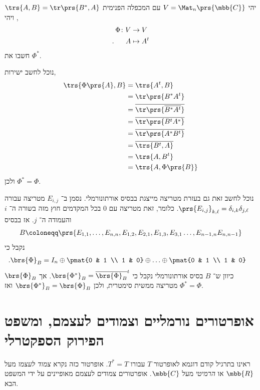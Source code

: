\documentclass[a4paper,10pt,twoside,openany]{book}
\begin{document}
\begin{exercisechap}
יהי
$V = \Mat_n\prs{\mbb{C}}$
עם המכפלה הפנימית
$\trs{A,B} = \tr\prs{B^*, A}$,
ויהי
\begin{align*}
    \Phi \colon V &\to V \\
    \text{.} \hphantom{lala} A &\mapsto A^t
\end{align*}
חשבו את
$\Phi^*$.
\end{exercisechap}

\begin{solution}
נוכל לחשב ישירות,
\begin{align*}
    \trs{\Phi\prs{A},B} &= \trs{A^t, B} \\&= \tr\prs{B^* A^t} \\&= \overline{\tr\prs{\overline{B^* A^t}}} \\&= \overline{\tr\prs{B^t A^*}} \\&= \overline{\tr\prs{A^* B^t}} \\&= \overline{\trs{B^t, A}} \\&= \trs{A, B^t} \\&= \trs{A, \Phi\prs{B}}
\end{align*}
ולכן
$\Phi^* = \Phi$.

נוכל לחשב זאת גם בעזרת מטריצה מייצגת בבסיס אורתונורמלי.
נסמן ב־%
$E_{i,j}$
מטריצה עבורה
$\prs{E_{i,j}}_{k,\ell} = \delta_{i,k} \delta_{j,\ell}$.
כלומר, זאת מטריצה עם
$0$
בכל המקדמים חוץ מזה בשורה ה־%
$i$
והעמודה ה־%
$j$.
אז בבסיס
\[B \coloneqq \prs{E_{1,1}, \ldots, E_{n,n}, E_{1,2}, E_{2,1}, E_{1,3}, E_{3,1} \ldots, E_{n-1, n} E_{n,n-1}}\]
נקבל כי
\begin{align*}
    \text{.} \brs{\Phi}_B &= I_n \oplus \pmat{0 & 1 \\ 1 & 0} \oplus \ldots \oplus \pmat{0 & 1 \\ 1 & 0}
\end{align*}
כיוון ש־%
$B$
בסיס אורתונורמלי
נקבל כי
$\brs{\Phi^*}_B = \overline{\brs{\Phi}_B}^t$.
אך
$\brs{\Phi}_B$
מטריצה ממשית סימטרית, ולכן
$\brs{\Phi^*}_B = \brs{\Phi}_B$
ואז
$\Phi^* = \Phi$.
\end{solution}

\section{אופרטורים נורמליים וצמודים לעצמם, ומשפט הפירוק הספקטרלי}

ראינו בתרגיל קודם דוגמא לאופרטור
$T$
עבורו
$T^* = T$.
אופרטור כזה נקרא
\emph{צמוד לעצמו}
מעל
$\mbb{R}$
או
\emph{הרמיטי}
מעל
$\mbb{C}$.
אופרטורים צמודים לעצמם מאופיינים על ידי המשפט הבא.
\end{document}
